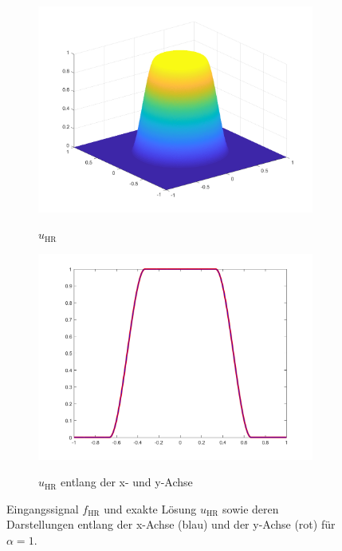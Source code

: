 \begin{figure}[p]
  \begin{subfigure}[b]{.48\linewidth}
    \centering
    \caption{$u_\textrm{HR}$}
    \includegraphics[trim = 40 30 30 30, clip, width=\linewidth]
      {pictures/chapExperiments/secExactSol/f04/exactSolution.png}
    \label{fig:f04ExactSol}
  \end{subfigure}
  \quad
  \begin{subfigure}[b]{.48\linewidth}
    \centering
    \caption{$u_\textrm{HR}$ entlang der x- und y-Achse}
    \includegraphics[trim = 50 30 50 20, clip, width=\linewidth]
      {pictures/chapExperiments/secExactSol/f04/exactSolutionAxis.png}
    \label{fig:f04ExactSolAxis}
  \end{subfigure} 
  \caption{Eingangssignal $f_\textrm{HR}$ und exakte Lösung $u_\textrm{HR}$
  sowie deren Darstellungen entlang der x-Achse (blau) und der y-Achse (rot)
  für $\alpha=1$.}
  \label{fig:f04Plots}
\end{figure}
